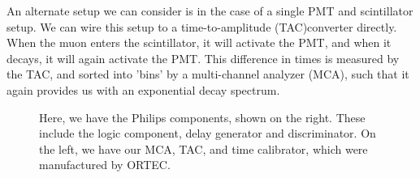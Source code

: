 \documentclass[10pt,letterpaper,onecolumn]{article}
\begin{document}
An alternate setup we can consider is in the case of a single PMT and scintillator setup. We can wire this setup to a time-to-amplitude (TAC)converter directly. When the muon enters the scintillator, it will activate the PMT, and when it decays, it will again activate the PMT. This difference in times is measured by the TAC, and sorted into 'bins' by a multi-channel analyzer (MCA), such that it again provides us with an exponential decay spectrum.
\begin{figure}
    \begin{center}
        \qquad
        \caption{Here, we have the Philips components, shown on the right. These include the logic component, delay generator and discriminator. On the left, we have our MCA, TAC, and time calibrator, which were manufactured by ORTEC.}%
        \label{fig:apparatus}%
    \end{center}
\end{figure}
\end{document}
